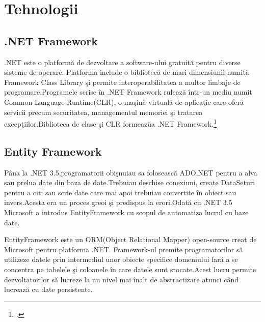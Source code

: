 \documentclass[a4paper,12pt]{report}
\begin{document}
\chapter{Tehnologii}

\section{.NET Framework}
.NET este o platform\u a de dezvoltare a software-ului gratuit\u a pentru diverse sisteme de operare.
Platforma include o bibliotec\u a de mari dimensiunii numit\u a Framework Class Library \c si permite interoperabilitatea
a multor limbaje de programare.Programele scrise \^in .NET Framework ruleaz\u a \^intr-un mediu numit
Common Language Runtime(CLR), o ma\c sin\u a virtual\u a de aplica\c tie care ofer\u a servicii precum
securitatea, managementul memoriei \c si tratarea excep\c tiilor.Biblioteca de clase \c si CLR formeaz\u ua 
.NET Framework.\footcite{wikidotNet}
\section{Entity Framework}
P\^ana la .NET 3.5,programatorii obi\c snuiau sa foloseasc\u a ADO.NET pentru a alva sau prelua date din 
baza de date.Trebuiau deschise conexiuni, create DataSeturi pentru a citi sau scrie date care mai apoi trebuiau 
convertite \^in obiect sau invers.Acesta era un proces greoi \c si predispus la erori.Odat\u a cu .NET 3.5
Microsoft a introdus EntityFramework cu scopul de automatiza lucrul cu baze date.

EntityFramework este un ORM(Object Relational Mapper) open-source creat de Microsoft pentru platforma .NET.
Framework-ul premite programatorilor s\u a utilizeze datele prin intermediul  unor obiecte specifice domeniului
far\u a a se concentra pe tabelele \c si coloanele \^in care datele sunt stocate.Acest lucru permite dezvoltatorilor 
s\u a lucreze la un nivel mai \^inalt de abstractizare atunci c\^ and lucreaz\u a cu date persistente.
\end{document}
